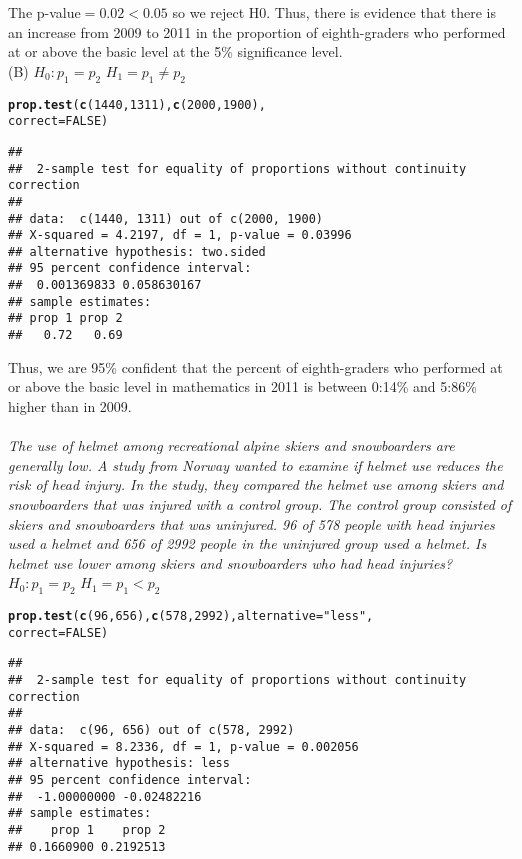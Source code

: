 \documentclass{article}\usepackage[]{graphicx}\usepackage[]{xcolor}
\makeatletter
\newcommand{\hlnum}[1]{\textcolor[rgb]{0.686,0.059,0.569}{#1}}%
\newcommand{\hlsng}[1]{\textcolor[rgb]{0.192,0.494,0.8}{#1}}%
\newcommand{\hldef}[1]{\textcolor[rgb]{0.345,0.345,0.345}{#1}}%
\newcommand{\hlkwc}[1]{\textcolor[rgb]{0.333,0.667,0.333}{#1}}%
\newcommand{\hlkwd}[1]{\textcolor[rgb]{0.737,0.353,0.396}{\textbf{#1}}}%
\newenvironment{kframe}{%
 \def\at@end@of@kframe{}%
 \ifinner\ifhmode%
  \def\at@end@of@kframe{\end{minipage}}%
  \begin{minipage}{\columnwidth}%
 \fi\fi%
 \def\FrameCommand##1{\hskip\@totalleftmargin \hskip-\fboxsep
 \colorbox{shadecolor}{##1}\hskip-\fboxsep
     \hskip-\linewidth \hskip-\@totalleftmargin \hskip\columnwidth}%
 \MakeFramed {\advance\hsize-\width
   \@totalleftmargin\z@ \linewidth\hsize
   \@setminipage}}%
 {\par\unskip\endMakeFramed%
 \at@end@of@kframe}
\newenvironment{knitrout}{}{} %
\makeatother
\begin{document}
The p-value$=0.02< 0.05$ so we reject H0. Thus, there is evidence that there is an increase from 2009 to 2011 in the proportion of eighth-graders who performed at or
above the basic level at the 5\% significance level.\\
(B) $H_0:p_1=p_2$  $H_1=p_1\neq p_2$
\begin{knitrout}
\color{fgcolor}\begin{kframe}
\begin{alltt}
\hlkwd{prop.test}\hldef{(}\hlkwd{c}\hldef{(}\hlnum{1440}\hldef{,} \hlnum{1311}\hldef{),} \hlkwd{c}\hldef{(}\hlnum{2000}\hldef{,} \hlnum{1900}\hldef{),}
          \hlkwc{correct} \hldef{=} \hlnum{FALSE}\hldef{)}
\end{alltt}
\begin{verbatim}
## 
## 	2-sample test for equality of proportions without continuity correction
## 
## data:  c(1440, 1311) out of c(2000, 1900)
## X-squared = 4.2197, df = 1, p-value = 0.03996
## alternative hypothesis: two.sided
## 95 percent confidence interval:
##  0.001369833 0.058630167
## sample estimates:
## prop 1 prop 2 
##   0.72   0.69
\end{verbatim}
\end{kframe}
\end{knitrout}
Thus, we are 95\% confident that the percent of eighth-graders who performed at or above the basic level in mathematics in 2011 is between 0:14\% and 5:86\% higher than in 2009.
\\ \\
\emph{The use of helmet among recreational alpine skiers and snowboarders are
generally low. A study from Norway wanted to examine if helmet use reduces the
risk of head injury. In the study, they compared the helmet use among skiers and snowboarders that was injured with a control group. The control group consisted of
skiers and snowboarders that was uninjured. 96 of 578 people with head injuries used a helmet and 656 of 2992 people in the uninjured group used a helmet. Is helmet use lower among skiers and snowboarders who had head injuries?}
\\
$H_0:p_1=p_2$  $H_1=p_1< p_2$
\begin{knitrout}
\color{fgcolor}\begin{kframe}
\begin{alltt}
\hlkwd{prop.test}\hldef{(}\hlkwd{c}\hldef{(}\hlnum{96}\hldef{,} \hlnum{656}\hldef{),} \hlkwd{c}\hldef{(}\hlnum{578}\hldef{,} \hlnum{2992}\hldef{),} \hlkwc{alternative} \hldef{=} \hlsng{"less"}\hldef{,}
          \hlkwc{correct} \hldef{=} \hlnum{FALSE}\hldef{)}
\end{alltt}
\begin{verbatim}
## 
## 	2-sample test for equality of proportions without continuity correction
## 
## data:  c(96, 656) out of c(578, 2992)
## X-squared = 8.2336, df = 1, p-value = 0.002056
## alternative hypothesis: less
## 95 percent confidence interval:
##  -1.00000000 -0.02482216
## sample estimates:
##    prop 1    prop 2 
## 0.1660900 0.2192513
\end{verbatim}
\end{kframe}
\end{knitrout}
\end{document}
